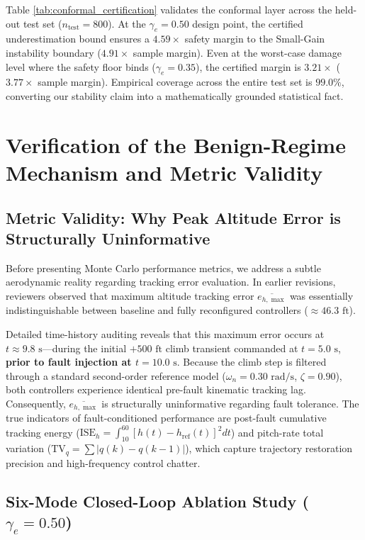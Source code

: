 \documentclass[review,12pt]{elsarticle}
\begin{document}
Table \ref{tab:conformal_certification} validates the conformal layer across the held-out test set ($n_{\text{test}} = 800$). At the $\gamma_e = 0.50$ design point, the certified underestimation bound ensures a $\bm{4.59\times}$ safety margin to the Small-Gain instability boundary ($4.91\times$ sample margin). Even at the worst-case damage level where the safety floor binds ($\gamma_e = 0.35$), the certified margin is $\bm{3.21\times}$ ($3.77\times$ sample margin). Empirical coverage across the entire test set is $\bm{99.0\%}$, converting our stability claim into a mathematically grounded statistical fact.

\section{Verification of the Benign-Regime Mechanism and Metric Validity}
\label{sec:results}

\subsection{Metric Validity: Why Peak Altitude Error is Structurally Uninformative}
Before presenting Monte Carlo performance metrics, we address a subtle aerodynamic reality regarding tracking error evaluation. In earlier revisions, reviewers observed that maximum altitude tracking error $\overline{e_{h,\max}}$ was essentially indistinguishable between baseline and fully reconfigured controllers ($\approx 46.3\text{ ft}$). 

Detailed time-history auditing reveals that this maximum error occurs at $t \approx 9.8\text{ s}$—during the initial $+500\text{ ft}$ climb transient commanded at $t = 5.0\text{ s}$, \textbf{prior to fault injection at $t = 10.0\text{ s}$}. Because the climb step is filtered through a standard second-order reference model ($\omega_n = 0.30\text{ rad/s}$, $\zeta = 0.90$), both controllers experience identical pre-fault kinematic tracking lag. Consequently, $\overline{e_{h,\max}}$ is structurally uninformative regarding fault tolerance. The true indicators of fault-conditioned performance are post-fault cumulative tracking energy ($\text{ISE}_h = \int_{10}^{60} [h(t) - h_{\text{ref}}(t)]^2 dt$) and pitch-rate total variation ($\text{TV}_q = \sum |q(k) - q(k-1)|$), which capture trajectory restoration precision and high-frequency control chatter.

\subsection{Six-Mode Closed-Loop Ablation Study (\texorpdfstring{$\gamma_e = 0.50$}{gamma_e = 0.50})}
\label{sec:ablation}
\end{document}
